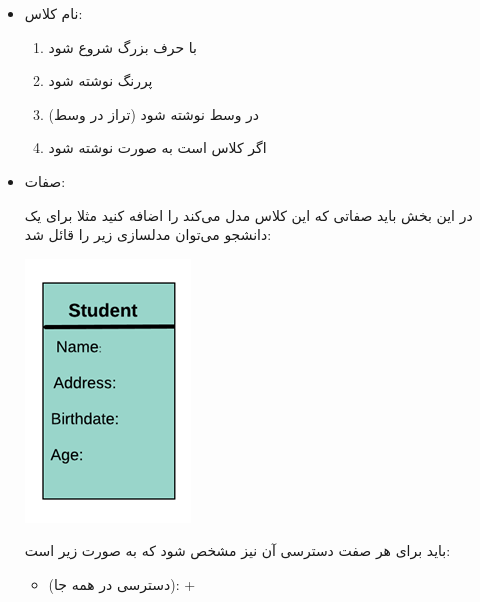 \documentclass[]{article}
\begin{document}
\begin{itemize}[label=\textcolor{listColor}{$\blacklozenge$}]
  \item
   {\fehrest \textcolor{listColor}{نام کلاس:}}
   

   \begin{enumerate}

\item
   با حرف بزرگ شروع شود
   
\item
پررنگ نوشته شود

\item
در وسط نوشته شود (تراز در وسط)

\item
اگر کلاس  است به صورت \textit{} نوشته شود

   
   
   
   \end{enumerate}
  
  \newpage
  
  \item
   {\fehrest \textcolor{listColor}{صفات: }}

   
   در این بخش باید صفاتی که این کلاس مدل می‌کند را اضافه کنید مثلا برای یک دانشجو می‌توان مدلسازی زیر را قائل شد:
   
   
  \begin{center}

\includegraphics[]{images/image15.png}

\end{center}

باید برای هر صفت دسترسی آن نیز مشخص شود که به صورت زیر است:

\begin{itemize}[label={\textbullet}]

\item
{} (دسترسی در همه جا):    +


\end{itemize}
\end{itemize}
\end{document}

